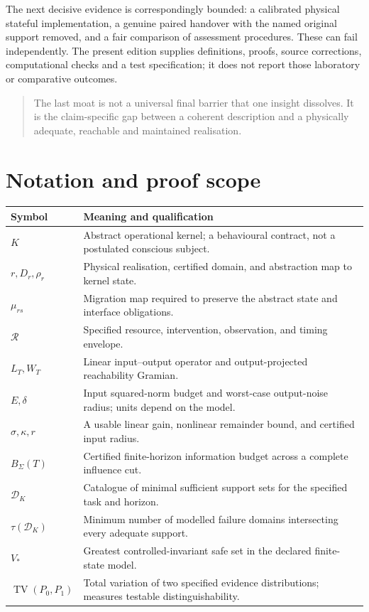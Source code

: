 \documentclass[11pt,a4paper]{article}
\theoremstyle{definition}
\theoremstyle{remark}
\newcommand{\calR}{\mathcal{R}}
\newcommand{\calK}{K}
\DeclareMathOperator{\TV}{TV}
\begin{document}
The next decisive evidence is correspondingly bounded: a calibrated physical stateful implementation, a genuine paired handover with the named original support removed, and a fair comparison of assessment procedures. These can fail independently. The present edition supplies definitions, proofs, source corrections, computational checks and a test specification; it does not report those laboratory or comparative outcomes.
\begin{quote}
The last moat is not a universal final barrier that one insight dissolves. It is the claim-specific gap between a coherent description and a physically adequate, reachable and maintained realisation.
\end{quote}

\appendix
\section{Notation and proof scope}\label{app:notation}
\begin{longtable}{@{}>{\raggedright\arraybackslash}p{}>{\raggedright\arraybackslash}p{}@{}}
\toprule
Symbol & Meaning and qualification\\
\midrule
\endhead
$\calK$ & Abstract operational kernel; a behavioural contract, not a postulated conscious subject.\\
$r,D_r,\rho_r$ & Physical realisation, certified domain, and abstraction map to kernel state.\\
$\mu_{rs}$ & Migration map required to preserve the abstract state and interface obligations.\\
$\calR$ & Specified resource, intervention, observation, and timing envelope.\\
$L_T,W_T$ & Linear input--output operator and output-projected reachability Gramian.\\
$E,\delta$ & Input squared-norm budget and worst-case output-noise radius; units depend on the model.\\
$\sigma,\kappa,r$ & A usable linear gain, nonlinear remainder bound, and certified input radius.\\
$B_\Sigma(T)$ & Certified finite-horizon information budget across a complete influence cut.\\
$\mathscr D_{\calK}$ & Catalogue of minimal sufficient support sets for the specified task and horizon.\\
$\tau(\mathscr D_{\calK})$ & Minimum number of modelled failure domains intersecting every adequate support.\\
$V_*$ & Greatest controlled-invariant safe set in the declared finite-state model.\\
$\TV(P_0,P_1)$ & Total variation of two specified evidence distributions; measures testable distinguishability.\\
\bottomrule
\end{longtable}
\end{document}
